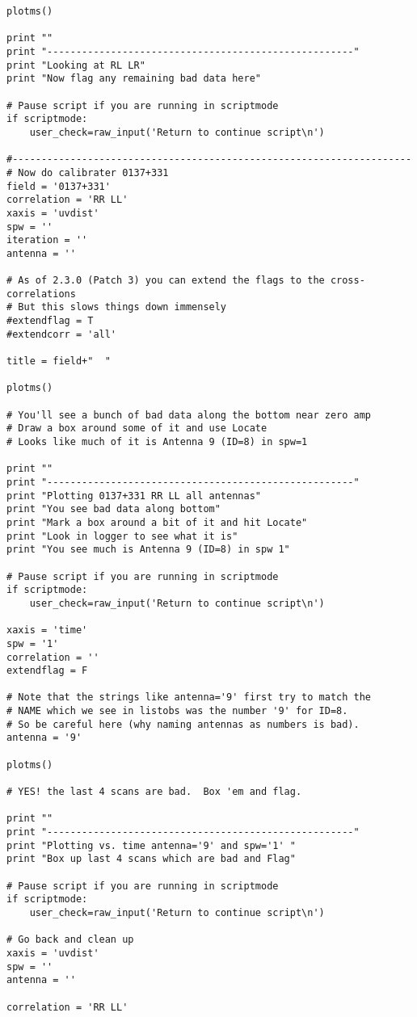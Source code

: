 \begin{verbatim}
plotms()

print ""
print "-----------------------------------------------------"
print "Looking at RL LR"
print "Now flag any remaining bad data here"

# Pause script if you are running in scriptmode
if scriptmode:
    user_check=raw_input('Return to continue script\n')

#---------------------------------------------------------------------
# Now do calibrater 0137+331
field = '0137+331'
correlation = 'RR LL'
xaxis = 'uvdist'
spw = ''
iteration = ''
antenna = ''

# As of 2.3.0 (Patch 3) you can extend the flags to the cross-correlations
# But this slows things down immensely
#extendflag = T
#extendcorr = 'all'

title = field+"  "

plotms()

# You'll see a bunch of bad data along the bottom near zero amp
# Draw a box around some of it and use Locate
# Looks like much of it is Antenna 9 (ID=8) in spw=1

print ""
print "-----------------------------------------------------"
print "Plotting 0137+331 RR LL all antennas"
print "You see bad data along bottom"
print "Mark a box around a bit of it and hit Locate"
print "Look in logger to see what it is"
print "You see much is Antenna 9 (ID=8) in spw 1"

# Pause script if you are running in scriptmode
if scriptmode:
    user_check=raw_input('Return to continue script\n')

xaxis = 'time'
spw = '1'
correlation = ''
extendflag = F

# Note that the strings like antenna='9' first try to match the 
# NAME which we see in listobs was the number '9' for ID=8.
# So be careful here (why naming antennas as numbers is bad).
antenna = '9'

plotms()

# YES! the last 4 scans are bad.  Box 'em and flag.

print ""
print "-----------------------------------------------------"
print "Plotting vs. time antenna='9' and spw='1' "
print "Box up last 4 scans which are bad and Flag"

# Pause script if you are running in scriptmode
if scriptmode:
    user_check=raw_input('Return to continue script\n')

# Go back and clean up
xaxis = 'uvdist'
spw = ''
antenna = ''

correlation = 'RR LL'


\end{verbatim}
